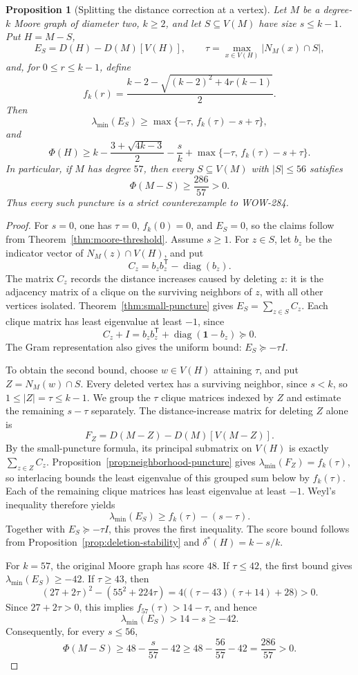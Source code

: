 \documentclass[a4paper,10pt,reqno]{amsart}
\theoremstyle{plain}
\newtheorem{proposition}[theorem]{Proposition}
\theoremstyle{definition}
\theoremstyle{remark}
\begin{document}
\begin{proposition}[Splitting the distance correction at a vertex]
\label{prop:clique-deletion-bound}
Let \(M\) be a degree-\(k\) Moore graph of diameter two, \(k\ge2\),
and let \(S\subseteq V(M)\) have size \(s\le k-1\).  Put \(H=M-S\),
\[
 E_S=D(H)-D(M)[V(H)],
 \qquad
 \tau=\max_{x\in V(H)}|N_M(x)\cap S|,
\]
and, for \(0\le r\le k-1\), define
\[
 f_k(r)=\frac{k-2-\sqrt{(k-2)^2+4r(k-1)}}2.
\]
Then
\[
 \lambda_{\min}(E_S)
 \ge \max\{-\tau,\,f_k(\tau)-s+\tau\},
\]
and
\[
 \Phi(H)\ge k-\frac{3+\sqrt{4k-3}}2-\frac{s}{k}
 +\max\{-\tau,\,f_k(\tau)-s+\tau\}.
\]
In particular, if \(M\) has degree \(57\), then every
\(S\subseteq V(M)\) with \(|S|\le56\) satisfies
\[
 \Phi(M-S)\ge\frac{286}{57}>0.
\]
Thus every such puncture is a strict counterexample to WOW-284.
\end{proposition}

\begin{proof}
For \(s=0\), one has \(\tau=0\), \(f_k(0)=0\), and \(E_S=0\), so the
claims follow from Theorem~\ref{thm:moore-threshold}.  Assume \(s\ge1\).
For \(z\in S\), let \(b_z\) be the indicator vector of
\(N_M(z)\cap V(H)\), and put
\[
 C_z=b_zb_z^{\mathsf T}-\operatorname{diag}(b_z).
\]
The matrix \(C_z\) records the distance increases caused by deleting
\(z\): it is the adjacency matrix of a clique on the surviving neighbors
of \(z\), with all other vertices isolated.
Theorem~\ref{thm:small-puncture} gives \(E_S=\sum_{z\in S}C_z\).
Each clique matrix has least eigenvalue at least \(-1\), since
\[
 C_z+I=b_zb_z^{\mathsf T}
       +\operatorname{diag}(\mathbf1-b_z)\succeq0.
\]
The Gram representation also gives the uniform bound:
\(E_S\succeq-\tau I\).

To obtain the second bound, choose \(w\in V(H)\) attaining \(\tau\),
and put \(Z=N_M(w)\cap S\).  Every deleted vertex has a surviving
neighbor, since \(s<k\), so \(1\le|Z|=\tau\le k-1\).
We group the \(\tau\) clique matrices indexed by \(Z\) and estimate
the remaining \(s-\tau\) separately.
The distance-increase matrix for deleting \(Z\) alone is
\[
 F_Z=D(M-Z)-D(M)[V(M-Z)].
\]
By the small-puncture formula, its principal submatrix on \(V(H)\)
is exactly \(\sum_{z\in Z}C_z\).
Proposition~\ref{prop:neighborhood-puncture} gives
\(\lambda_{\min}(F_Z)=f_k(\tau)\), so interlacing bounds the least
eigenvalue of this grouped sum below by \(f_k(\tau)\).
Each of the remaining clique matrices has least eigenvalue at least
\(-1\).  Weyl's inequality therefore yields
\[
 \lambda_{\min}(E_S)
 \ge f_k(\tau)-(s-\tau).
\]
Together with \(E_S\succeq-\tau I\), this proves the first inequality.
The score bound follows from Proposition~\ref{prop:deletion-stability}
and \(\delta^*(H)=k-s/k\).

For \(k=57\), the original Moore graph has score \(48\).  If \(\tau\le42\), the first
bound gives \(\lambda_{\min}(E_S)\ge-42\).  If \(\tau\ge43\), then
\[
 (27+2\tau)^2-(55^2+224\tau)
 =4\bigl((\tau-43)(\tau+14)+28\bigr)>0.
\]
Since \(27+2\tau>0\), this implies
\(f_{57}(\tau)>14-\tau\), and hence
\[
 \lambda_{\min}(E_S)>14-s\ge-42.
\]
Consequently, for every \(s\le56\),
\[
 \Phi(M-S)\ge48-\frac{s}{57}-42
 \ge48-\frac{56}{57}-42=\frac{286}{57}>0.
\]
\end{proof}
\end{document}
